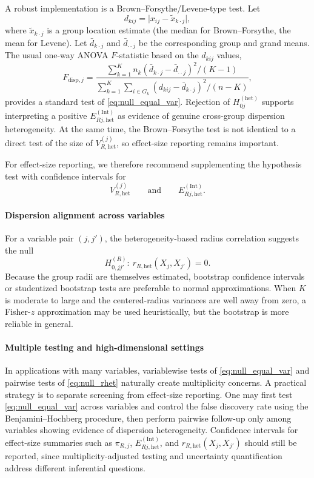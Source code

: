 \documentclass[preprint, times, 12pt, authoryear]{elsarticle}
\begin{document}
A robust implementation is a Brown--Forsythe/Levene-type test. Let
\[
d_{kij}=\big|x_{ij}-\tilde x_{k\cdot j}\big|,
\]
where $\tilde x_{k\cdot j}$ is a group location estimate (the median for Brown--Forsythe, the mean for Levene). Let $\bar d_{k\cdot j}$ and $\bar d_{\cdot\cdot j}$ be the corresponding group and grand means. The usual one-way ANOVA $F$-statistic based on the $d_{kij}$ values,
\begin{equation}\label{eq:BF_statistic}
	F_{\mathrm{disp},j}
	=
	\frac{\sum_{k=1}^K n_k(\bar d_{k\cdot j}-\bar d_{\cdot\cdot j})^2/(K-1)}
	{\sum_{k=1}^K\sum_{i\in G_k}(d_{kij}-\bar d_{k\cdot j})^2/(n-K)},
\end{equation}
provides a standard test of \eqref{eq:null_equal_var}. Rejection of $H_{0j}^{(\mathrm{het})}$ supports interpreting a positive $E_{Rj,\mathrm{het}}^{(\mathrm{Int})}$ as evidence of genuine cross-group dispersion heterogeneity. At the same time, the Brown--Forsythe test is not identical to a direct test of the size of \(V_{R,\mathrm{het}}^{(j)}\), so effect-size reporting remains important.

For effect-size reporting, we therefore recommend supplementing the hypothesis test with confidence intervals for
\[
V_{R,\mathrm{het}}^{(j)}
\qquad\text{and}\qquad
E_{Rj,\mathrm{het}}^{(\mathrm{Int})}.
\]

\paragraph{Dispersion alignment across variables}
For a variable pair $(j,j')$, the heterogeneity-based radius correlation suggests the null
\begin{equation}\label{eq:null_rhet}
	H_{0,jj'}^{(R)}:\ r_{R,\mathrm{het}}(X_j,X_{j'})=0.
\end{equation}
Because the group radii are themselves estimated, bootstrap confidence intervals or studentized bootstrap tests are preferable to normal approximations. When $K$ is moderate to large and the centered-radius variances are well away from zero, a Fisher-$z$ approximation may be used heuristically, but the bootstrap is more reliable in general.

\paragraph{Multiple testing and high-dimensional settings}
In applications with many variables, variablewise tests of \eqref{eq:null_equal_var} and pairwise tests of \eqref{eq:null_rhet} naturally create multiplicity concerns. A practical strategy is to separate screening from effect-size reporting. One may first test \eqref{eq:null_equal_var} across variables and control the false discovery rate using the Benjamini--Hochberg procedure, then perform pairwise follow-up only among variables showing evidence of dispersion heterogeneity. Confidence intervals for effect-size summaries such as $\pi_{R,j}$, $E_{Rj,\mathrm{het}}^{(\mathrm{Int})}$, and $r_{R,\mathrm{het}}(X_j,X_{j'})$ should still be reported, since multiplicity-adjusted testing and uncertainty quantification address different inferential questions.
\end{document}
